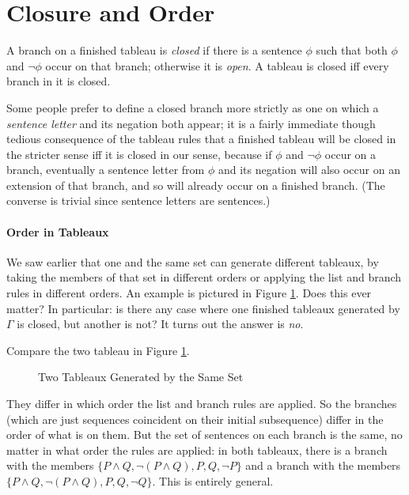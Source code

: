 \section{Closure and Order}
\begin{definition}[Closed]
	A branch on a finished tableau is \emph{closed} if there is a sentence $\phi$ such that both $\phi$ and $¬\phi$ occur on that branch; otherwise it is \emph{open}. A tableau is closed iff every branch in it is closed.
\end{definition}
Some people prefer to define a closed branch more strictly as one on which a \emph{sentence letter} and its negation both appear; it is a fairly immediate though tedious consequence of the tableau rules that a finished tableau will be closed in the stricter sense iff it is closed in our sense, because if $\phi$ and $¬ \phi$ occur on a branch, eventually a sentence letter from $\phi$ and its negation will also occur on an extension of that branch, and so will already occur on a finished branch. (The converse is trivial since sentence letters are sentences.)


\paragraph{Order in Tableaux}

We saw earlier that one and the same set can generate different tableaux, by taking the members of that set in different orders or applying the list and branch rules in different orders. An example is pictured in Figure \ref{figdoublegen}.  Does this ever matter? In particular: is there any case where one finished tableaux generated by $\Gamma$ is closed, but another is not? It turns out the answer is \emph{no}.

Compare the two tableau in Figure \ref{figdoublegen}. \begin{figure}
	\centering
	\qquad\quad
	\caption{Two Tableaux Generated by the Same Set \label{figdoublegen}}
\end{figure} They differ in which order the list and branch rules are applied. So the branches (which are just sequences coincident on their initial subsequence) differ in the order of what is on them. But the set of sentences on each branch is the same, no matter in what order the rules are applied: in both tableaux, there is a branch with the members $\{P \wedge Q, \neg(P \wedge Q), P, Q, \neg P\}$ and a branch with the members $\{P \wedge Q, \neg(P \wedge Q), P, Q, \neg Q\}$. This is entirely general.

